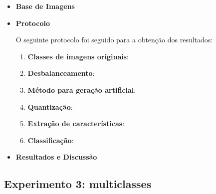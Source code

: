 \begin{itemize}
\item[] \textbf{Base de Imagens}


\item[] \textbf{Protocolo}

O seguinte protocolo foi seguido para a obtenção dos resultados:

\begin{enumerate}
\item \textbf{Classes de imagens originais}:
\item \textbf{Desbalanceamento}:
\item \textbf{Método para geração artificial}:
\item \textbf{Quantização}:
\item \textbf{Extração de características}:
\item \textbf{Classificação}:
\end{enumerate}
\item[] \textbf{Resultados e Discussão}

\end{itemize}

\subsection{Experimento 3: multiclasses}

